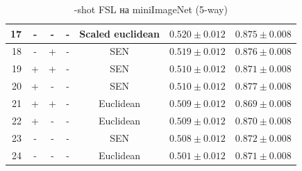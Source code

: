 \documentclass[a4paper, 12pt]{report}
\begin{document}
\begin{table}[h!]
\begin{adjustbox}{center}
\begin{tabular}{| r | c c c c | c |  c | }
\hline
 17 & -               & -      & -      & Scaled euclidean & $0.520 \pm 0.012$ & $0.875 \pm 0.008$ \\
\hline
 18 & -               & +      & -      & SEN              & $0.519 \pm 0.012$ & $0.876 \pm 0.008$ \\
\hline
 19 & +               & +      & -      & SEN              & $0.510 \pm 0.012$ & $0.871 \pm 0.008$ \\
\hline
 20 & +               & -      & -      & SEN              & $0.510 \pm 0.012$ & $0.877 \pm 0.008$ \\
\hline
 21 & +               & +      & -      & Euclidean        & $0.509 \pm 0.012$ & $0.869 \pm 0.008$ \\
\hline
 22 & +               & -      & -      & Euclidean        & $0.509 \pm 0.012$ & $0.870 \pm 0.008$ \\
\hline
 23 & -               & -      & -      & SEN              & $0.508 \pm 0.012$ & $0.872 \pm 0.008$ \\
\hline
 24 & -               & -      & -      & Euclidean        & $0.501 \pm 0.012$ & $0.871 \pm 0.008$ \\
\hline
\end{tabular}
\end{adjustbox}
	\caption{-shot FSL на miniImageNet (5-way)}
\end{table}
\end{document}
